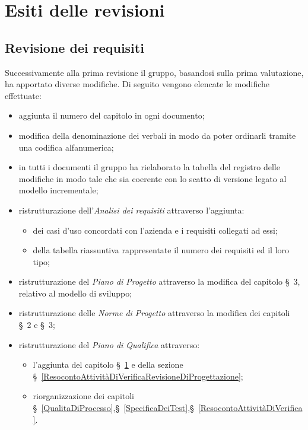 \chapter{Esiti delle revisioni}\label{EsitiDelleRevisioni}

\section{Revisione dei requisiti}\label{EsitiDelleRevisioniRevisioneDeiRequisiti}

Successivamente alla prima revisione il gruppo, basandosi sulla prima valutazione, ha apportato diverse modifiche. Di seguito vengono elencate le modifiche effettuate:
\begin{itemize}
	\item aggiunta il numero del capitolo in ogni documento;
	\item modifica della denominazione dei verbali in modo da poter ordinarli tramite una codifica alfanumerica; 
	\item in tutti i documenti il gruppo ha rielaborato la tabella del registro delle modifiche in modo tale che sia coerente con lo scatto di versione legato al modello incrementale;
	\item ristrutturazione dell'\textit{Analisi dei requisiti} attraverso l'aggiunta: 
	\begin{itemize}
		\item dei casi d'uso concordati con l'azienda e i requisiti collegati ad essi;
		\item della tabella riassuntiva rappresentate il numero dei requisiti ed il loro tipo;
	\end{itemize}
	\item ristrutturazione del \textit{Piano di Progetto} attraverso la modifica del capitolo \S~3, relativo al modello di sviluppo;
	\item ristrutturazione delle \textit{Norme di Progetto} attraverso la modifica dei capitoli \S~2 e \S~3;
	\item ristrutturazione del \textit{Piano di Qualifica} attraverso:
	\begin{itemize}
		\item l'aggiunta del capitolo \S~\ref{EsitiDelleRevisioni} e della sezione \S~\ref{ResocontoAttivitàDiVerificaRevisioneDiProgettazione};%
		\item riorganizzazione dei capitoli \S~\ref{QualitaDiProcesso},\S~\ref{SpecificaDeiTest},\S~\ref{ResocontoAttivitàDiVerifica}.
	\end{itemize}
\end{itemize}

